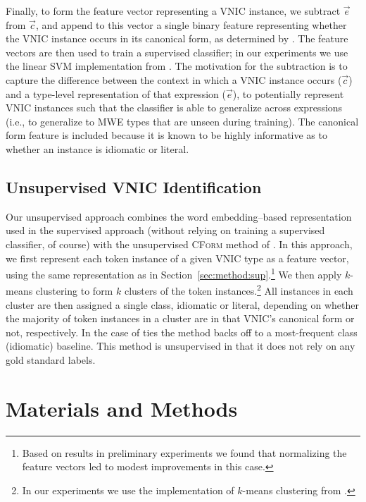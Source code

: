 \documentclass[11pt]{article}
\newcommand{\secref}[1]{Section~\ref{#1}}
\newcommand{\cform}{\textsc{CForm}\xspace}
\newcommand{\VNIC}{VNIC\xspace}
\begin{document}
Finally, to form the feature vector representing a \VNIC instance, we
subtract $\vec{e}$ from $\vec{c}$, and append to this vector a single
binary feature representing whether the \VNIC instance occurs in its
canonical form, as determined by \cite{Fazly2009}. The feature vectors
are then used to train a supervised classifier; in our experiments we
use the linear SVM implementation from \cite{pedregosa2011scikit}.
The motivation for the subtraction is to capture the difference
between the context in which a \VNIC instance occurs ($\vec{c}$) and a
type-level representation of that expression ($\vec{e}$), to
potentially represent \VNIC instances such that the classifier is able
to generalize across expressions (i.e., to generalize to MWE types
that are unseen during training). The canonical form feature is
included because it is known to be highly informative as to whether an
instance is idiomatic or literal.


\subsection{Unsupervised VNIC Identification\label{sec:method:unsup}}

Our unsupervised approach combines the word embedding--based
representation used in the supervised approach (without relying on
training a supervised classifier, of course) with the unsupervised
\cform method of \cite{Fazly2009}. In this approach, we first
represent each token instance of a given \VNIC type as a feature
vector, using the same representation as in
\secref{sec:method:sup}.\footnote{Based on results in preliminary
  experiments we found that normalizing the feature vectors led to
  modest improvements in this case.} We then apply $k$-means
clustering to form $k$ clusters of the token instances.\footnote{In
  our experiments we use the implementation of $k$-means clustering
  from \cite{pedregosa2011scikit}.}  All instances in each cluster are
then assigned a single class, idiomatic or literal, depending on
whether the majority of token instances in a cluster are in that
\VNIC's canonical form or not, respectively. In the case of ties the
method backs off to a most-frequent class (idiomatic) baseline. This
method is unsupervised in that it does not rely on any gold standard
labels.

\section{Materials and Methods}
\end{document}
